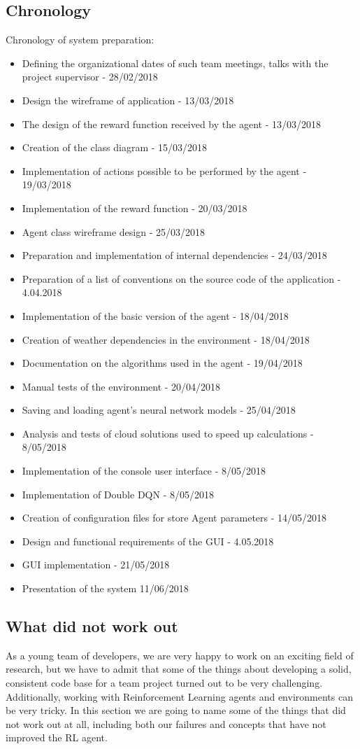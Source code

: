 \documentclass{article}
\begin{document}
\subsection{Chronology}
Chronology of system preparation:
\begin{itemize}
\item Defining the organizational dates of such team meetings, talks with the project supervisor - 28/02/2018
\item Design the wireframe of application - 13/03/2018
\item The design of the reward function received by the agent - 13/03/2018
\item Creation of the class diagram - 15/03/2018
\item Implementation of actions possible to be performed by the agent - 19/03/2018
\item  Implementation of the reward function - 20/03/2018
\item  Agent class wireframe design - 25/03/2018
\item Preparation and implementation of internal dependencies - 24/03/2018
\item Preparation of a list of conventions on the source code of the application - 4.04.2018
\item Implementation of the basic version of the agent - 18/04/2018
\item Creation of weather dependencies in the environment - 18/04/2018
\item Documentation on the algorithms used in the agent - 19/04/2018
\item Manual tests of the environment - 20/04/2018
\item Saving and loading agent's neural network models - 25/04/2018
\item Analysis and tests of cloud solutions used to speed up calculations - 8/05/2018
\item Implementation of the console user interface - 8/05/2018
\item Implementation of Double DQN - 8/05/2018
\item Creation of configuration files for store Agent parameters - 14/05/2018
\item Design and functional requirements of the GUI - 4.05.2018
\item GUI implementation - 21/05/2018
\item Presentation of the system 11/06/2018
\end{itemize}
\subsection{What did not work out}
As a young team of developers, we are very happy to work on an exciting field of research, but we have to admit that some of the things about developing a solid, consistent code base for a team project turned out to be very challenging. Additionally, working with Reinforcement Learning agents and environments can be very tricky. In this section we are going to name some of the things that did not work out at all, including both our failures and concepts that have not improved the RL agent. 
\end{document}
